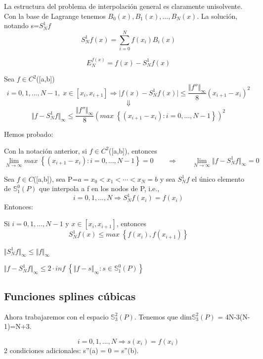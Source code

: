 La estructura del problema de interpolación general es claramente unisolvente. Con la base de Lagrange tenemos {$B_0(x), B_1(x),...,B_N(x)$}. La solución, notando s=$S_N^1f$
\[ S_N^1f(x) = \sum_{i=0}^N f(x_i)B_i(x) \]

\begin{ndef}
\[ E_N^{f(x)} = f(x) - S_N^1f(x) \]
\end{ndef}

Sea $f \in C^2$([a,b])
\[ i=0,1,...,N-1, \; x \in \left[ x_i,x_{i+1} \right] \Rightarrow \vert f(x) - S_N^1f(x) \vert \leq \frac{\Vert f'' \Vert _\infty}{8}(x_{i+1}-x_i)^2 \]
\[ \Downarrow \]
\[ \Vert f-S_N^1f \Vert _\infty \leq \frac{\Vert f'' \Vert _\infty}{8} \left( max \; \left\lbrace (x_{i+1}-x_i):i=0,...,N-1 \right\rbrace \right) ^2 \]

Hemos probado:

\begin{nprop}
Con la notación anterior, si $f \in C^2$([a,b]), entonces
\[ \lim_{N\rightarrow \infty} max \; \left\lbrace (x_{i+1}-x_i):i=0,...,N-1 \right\rbrace = 0 \qquad \Rightarrow \qquad \lim_{N \rightarrow \infty} \Vert f - S_N^1f \Vert _\infty = 0 \]
\end{nprop}

\begin{nprop}
Sea $f \in C$([a,b]), sea P={$a=x_0 < x_1 < \cdots < x_N = b$} y sea $S_N^1f$ el único elemento de $\mathbb{S}_1^0(P)$ que interpola a f en los nodos de P, i.e.,
\[ i=0,1,...,N \Rightarrow S_N^1f(x_i)=f(x_i) \]
Entonces:
	\begin{nlist}
	\item Si $i=0,1,...,N-1$ y $x \in \left[ x_i,x_{i+1} \right]$, entonces
	\[ S_N^1f(x) \leq max \; \left\lbrace f(x_i),f(x_{i+1}) \right\rbrace \]
	\item $\Vert S_N^1f \Vert _\infty \leq \Vert f \Vert _\infty $
	\item $\Vert f - S_N^1f \Vert _\infty \leq 2 \cdot inf \; \left\lbrace \Vert f-s \Vert _\infty : s \in \mathbb{S}_1^0(P) \right\rbrace$
	\end{nlist}
\end{nprop}

\subsection{Funciones splines cúbicas}
Ahora trabajaremos con el espacio $\mathbb{S}_3^2(P)$. Tenemos que dim$\mathbb{S}_3^2(P)$ = 4N-3(N-1)=N+3.

\begin{ndef}
\[ i=0,1,...,N \Rightarrow s(x_i) = f(x_i) \]
2 condiciones adicionales: s''(a) = 0 = s''(b).
\end{ndef}

